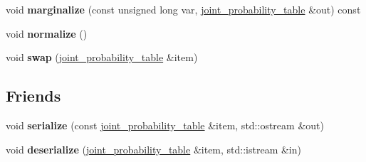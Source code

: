\begin{DoxyCompactItemize}
\item 
\hypertarget{classdlib_1_1joint__probability__table_a1cfe903f47b2bbc69e75b4fa6bfc3b79}{
void {\bfseries marginalize} (const unsigned long var, \hyperlink{classdlib_1_1joint__probability__table}{joint\_\-probability\_\-table} \&out) const }
\label{classdlib_1_1joint__probability__table_a1cfe903f47b2bbc69e75b4fa6bfc3b79}

\item 
\hypertarget{classdlib_1_1joint__probability__table_a2886ef7c11d08c6b294dd34348ae81ca}{
void {\bfseries normalize} ()}
\label{classdlib_1_1joint__probability__table_a2886ef7c11d08c6b294dd34348ae81ca}

\item 
\hypertarget{classdlib_1_1joint__probability__table_a971c4513f167bf91df70836e579ebed6}{
void {\bfseries swap} (\hyperlink{classdlib_1_1joint__probability__table}{joint\_\-probability\_\-table} \&item)}
\label{classdlib_1_1joint__probability__table_a971c4513f167bf91df70836e579ebed6}

\end{DoxyCompactItemize}
\subsection*{Friends}
\begin{DoxyCompactItemize}
\item 
\hypertarget{classdlib_1_1joint__probability__table_ac8164cee0a2afc188db58cf8b9f956ce}{
void {\bfseries serialize} (const \hyperlink{classdlib_1_1joint__probability__table}{joint\_\-probability\_\-table} \&item, std::ostream \&out)}
\label{classdlib_1_1joint__probability__table_ac8164cee0a2afc188db58cf8b9f956ce}

\item 
\hypertarget{classdlib_1_1joint__probability__table_a8a45c8c2ae3fe15192383713af6ed400}{
void {\bfseries deserialize} (\hyperlink{classdlib_1_1joint__probability__table}{joint\_\-probability\_\-table} \&item, std::istream \&in)}
\label{classdlib_1_1joint__probability__table_a8a45c8c2ae3fe15192383713af6ed400}

\end{DoxyCompactItemize}


